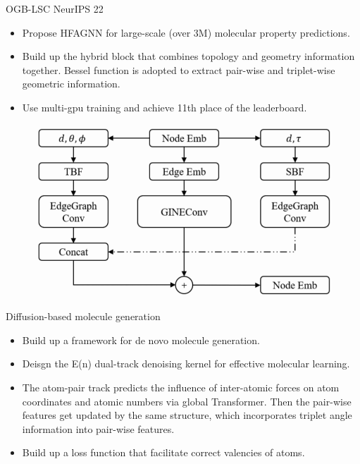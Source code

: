 \documentclass{beamer}
\begin{document}
\begin{frame}{OGB-LSC NeurIPS 22}
    \begin{itemize}
        \item Propose HFAGNN for large-scale (over 3M) molecular property predictions.
        \item Build up the hybrid block that combines topology and geometry information together. Bessel function is adopted to extract pair-wise and triplet-wise geometric information.
        \item Use multi-gpu training and achieve 11th place of the leaderboard. 
    \end{itemize}
    \begin{figure}[H]
        \centering
        \includegraphics[width=0.6\linewidth]{figure/hfagnn.png}
    \end{figure}
\end{frame}

\begin{frame}{Diffusion-based molecule generation}
    \begin{itemize}
        \item Build up a framework for de novo molecule generation.
        \item Deisgn the E(n) dual-track denoising kernel for effective molecular learning.
        \item The atom-pair track predicts the influence of inter-atomic forces on atom coordinates and atomic numbers via global Transformer. Then the pair-wise features get updated by the same structure, which incorporates triplet angle information into pair-wise features.
        \item Build up a loss function that facilitate correct valencies of atoms.
    \end{itemize}
\end{frame}
\end{document}
